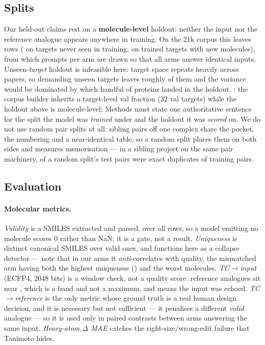 \subsection{Splits}

Our held-out claims rest on a \textbf{molecule-level} holdout: neither the input nor the reference
analogue appears anywhere in training. On the 21k corpus this leaves  rows
( on targets never seen in training,  on trained targets with new molecules), from
which  prompts per arm are drawn so that all arms answer identical inputs. Unseen-\emph{target}
holdout is infeasible here: target space repeats heavily across papers, so demanding unseen targets
leaves roughly  of them and the variance would be dominated by which handful of proteins
landed in the holdout. : the corpus builder inherits a target-level
val fraction (32 val targets) while the holdout above is molecule-level; Methods must state one
authoritative sentence for the split the model was \emph{trained} under and the holdout it was
\emph{scored} on. We do not use random pair splits at all: sibling pairs off one complex share the
pocket, the numbering and a near-identical table, so a random split places them on both sides and
measures memorisation --- in a sibling project on the same pair machinery,  of a random
split's test pairs were exact duplicates of training pairs.

\subsection{Evaluation}

\paragraph{Molecular metrics.} \emph{Validity} is a SMILES extracted and parsed, over all rows, so
a model emitting no molecule scores 0 rather than NaN; it is a gate, not a result.
\emph{Uniqueness} is distinct canonical SMILES over valid ones, and functions here as a
collapse detector --- note that in our arms it \emph{anti}-correlates with quality, the mismatched
arm having both the highest uniqueness () and the worst molecules. \emph{TC$\rightarrow$input}
(ECFP4, 2048 bits) is a window check, not a quality score: reference analogues sit near ,
which is a band and not a maximum, and  means the input was echoed.
\emph{TC$\rightarrow$reference} is the only metric whose ground truth is a real human design
decision, and it is necessary but not sufficient --- it penalises a different \emph{valid} analogue
--- so it is used only in paired contrasts between arms answering the same input.
\emph{Heavy-atom $\Delta$ MAE} catches the right-size/wrong-edit failure that Tanimoto hides.

